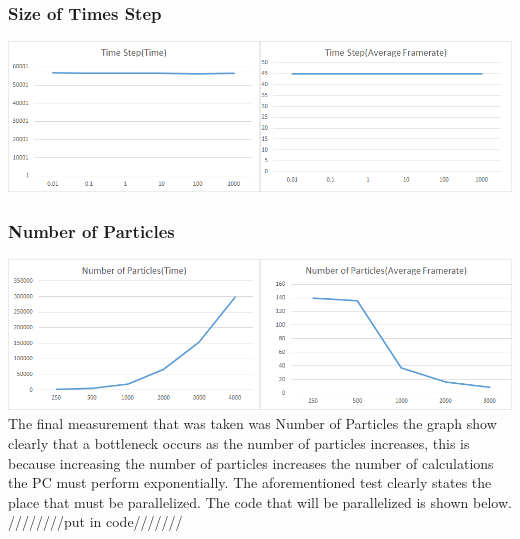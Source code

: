 \documentclass[12pt]{article}
\begin{document}
\subsubsection{Size of Times Step}
\includegraphics[scale=0.5]{pics/iatime.png}
\newline

\subsubsection{ Number of Particles}
\includegraphics[scale=0.5]{pics/ianumber.png}
\newline
The final measurement that was taken was Number of Particles the graph show clearly that a bottleneck occurs as the number of particles increases, this is because increasing the number of particles increases the number of calculations the PC must perform exponentially. The aforementioned test clearly states the place that must be parallelized. The code that will be parallelized is shown below.
////////put in code/////// 
\newline
	
\end{document}
